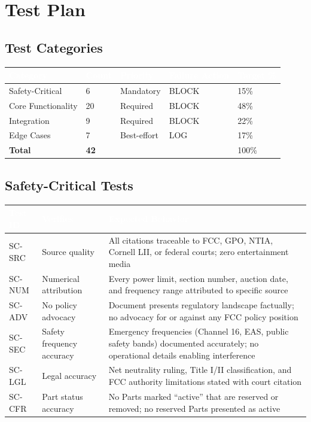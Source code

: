 \documentclass[11pt,letterpaper]{article}
\newcommand{\tableheader}[1]{\textbf{\sffamily\textcolor{white}{#1}}}
\begin{document}
\section{Test Plan}

\subsection{Test Categories}

\begin{center}
\begin{tabularx}{\textwidth}{L{3cm}C{2cm}C{2cm}C{2.5cm}C{2.5cm}}
\toprule
{}
\tableheader{Category} & \tableheader{Count} & \tableheader{Priority} & \tableheader{Failure Action} & \tableheader{Target \%} \\
\midrule
Safety-Critical & 6 & Mandatory & BLOCK & 15\% \\
Core Functionality & 20 & Required & BLOCK & 48\% \\
Integration & 9 & Required & BLOCK & 22\% \\
Edge Cases & 7 & Best-effort & LOG & 17\% \\
\midrule
\textbf{Total} & \textbf{42} & & & 100\% \\
\bottomrule
\end{tabularx}
\end{center}

\subsection{Safety-Critical Tests}

\begin{center}
\begin{tabularx}{\textwidth}{C{1.5cm}L{4cm}X}
\toprule
{}
\tableheader{Test ID} & \tableheader{Verifies} & \tableheader{Expected Behavior} \\
\midrule
SC-SRC & Source quality & All citations traceable to FCC, GPO, NTIA, Cornell LII, or federal courts; zero entertainment media \\
SC-NUM & Numerical attribution & Every power limit, section number, auction date, and frequency range attributed to specific source \\
SC-ADV & No policy advocacy & Document presents regulatory landscape factually; no advocacy for or against any FCC policy position \\
SC-SEC & Safety frequency accuracy & Emergency frequencies (Channel 16, EAS, public safety bands) documented accurately; no operational details enabling interference \\
SC-LGL & Legal accuracy & Net neutrality ruling, Title I/II classification, and FCC authority limitations stated with court citation \\
SC-CFR & Part status accuracy & No Parts marked ``active'' that are reserved or removed; no reserved Parts presented as active \\
\bottomrule
\end{tabularx}
\end{center}
\end{document}
